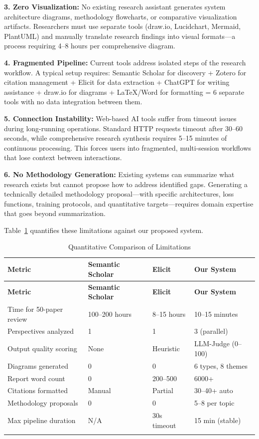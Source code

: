 \documentclass[a4paper,12pt,openany]{report}
\begin{document}
\textbf{3. Zero Visualization:} No existing research assistant generates system architecture diagrams, methodology flowcharts, or comparative visualization artifacts. Researchers must use separate tools (draw.io, Lucidchart, Mermaid, PlantUML) and manually translate research findings into visual formats---a process requiring 4--8 hours per comprehensive diagram.

\textbf{4. Fragmented Pipeline:} Current tools address isolated steps of the research workflow. A typical setup requires: Semantic Scholar for discovery + Zotero for citation management + Elicit for data extraction + ChatGPT for writing assistance + draw.io for diagrams + LaTeX/Word for formatting = 6 separate tools with no data integration between them.

\textbf{5. Connection Instability:} Web-based AI tools suffer from timeout issues during long-running operations. Standard HTTP requests timeout after 30--60 seconds, while comprehensive research synthesis requires 5--15 minutes of continuous processing. This forces users into fragmented, multi-session workflows that lose context between interactions.

\textbf{6. No Methodology Generation:} Existing systems can summarize what research exists but cannot propose how to address identified gaps. Generating a technically detailed methodology proposal---with specific architectures, loss functions, training protocols, and quantitative targets---requires domain expertise that goes beyond summarization.

Table~\ref{tab:limitations} quantifies these limitations against our proposed system.

\begin{longtable}{|p{4cm}|p{2.5cm}|p{2.5cm}|p{3.5cm}|}
\hline
\textbf{Metric} & \textbf{Semantic Scholar} & \textbf{Elicit} & \textbf{Our System} \\
\hline
\endfirsthead
\hline
\textbf{Metric} & \textbf{Semantic Scholar} & \textbf{Elicit} & \textbf{Our System} \\
\hline
\endhead
\hline
\endfoot
Time for 50-paper review & 100--200 hours & 8--15 hours & 10--15 minutes \\
\hline
Perspectives analyzed & 1 & 1 & 3 (parallel) \\
\hline
Output quality scoring & None & Heuristic & LLM-Judge (0--100) \\
\hline
Diagrams generated & 0 & 0 & 6 types, 8 themes \\
\hline
Report word count & 0 & 200--500 & 6000+ \\
\hline
Citations formatted & Manual & Partial & 30--40+ auto \\
\hline
Methodology proposals & 0 & 0 & 5--8 per topic \\
\hline
Max pipeline duration & N/A & 30s timeout & 15 min (stable) \\
\hline

\caption{Quantitative Comparison of Limitations}
\label{tab:limitations}
\end{longtable}
\end{document}
